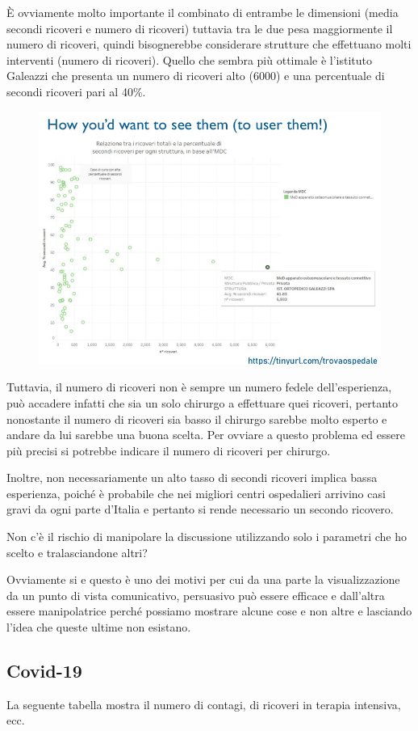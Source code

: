 \documentclass[12pt,a4paper]{report}
\begin{document}
\`E ovviamente molto importante il combinato di entrambe le dimensioni (media secondi ricoveri e numero di ricoveri) tuttavia tra le due pesa maggiormente il numero di ricoveri, quindi bisognerebbe considerare strutture che effettuano molti interventi (numero di ricoveri). Quello che sembra più ottimale è l'istituto Galeazzi che presenta un numero di ricoveri alto (6000) e una percentuale di secondi ricoveri pari al 40\%.

\begin{figure}[h]
	\centering
	\includegraphics[width=0.4\linewidth]{imgs datavis/Ospedali.png}
	\caption{}
	\label{fig:esperienza strutture ospedaliere Lombardia}
\end{figure} 

Tuttavia, il numero di ricoveri non è sempre un numero fedele dell'esperienza, può accadere infatti che sia un solo chirurgo a effettuare quei ricoveri, pertanto nonostante il numero di ricoveri sia basso il chirurgo sarebbe molto esperto e andare da lui sarebbe una buona scelta. Per ovviare a questo problema ed essere più precisi si potrebbe indicare il numero di ricoveri per chirurgo.

Inoltre, non necessariamente un alto tasso di secondi ricoveri implica bassa esperienza, poiché è probabile che nei migliori centri ospedalieri arrivino casi gravi da ogni parte d'Italia e pertanto si rende necessario un secondo ricovero. 

Non c'è il rischio di manipolare la discussione utilizzando solo i parametri che ho scelto e tralasciandone altri? 

Ovviamente si e questo è uno dei motivi per cui da una parte la visualizzazione da un punto di vista comunicativo, persuasivo può essere efficace e dall'altra essere manipolatrice perché possiamo mostrare alcune cose e non altre e lasciando l'idea che queste ultime non esistano.

\subsection{Covid-19}
La seguente tabella mostra il numero di contagi, di ricoveri in terapia intensiva, ecc. 
\end{document}
